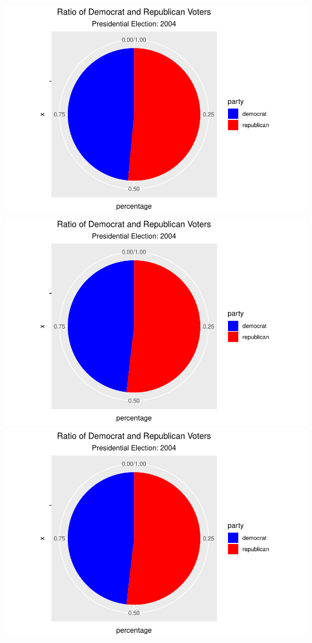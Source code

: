 \documentclass[
]{article}
\begin{document}
\includegraphics{election_files/figure-latex/anim-64.pdf}
\includegraphics{election_files/figure-latex/anim-65.pdf}
\includegraphics{election_files/figure-latex/anim-66.pdf}
\end{document}
